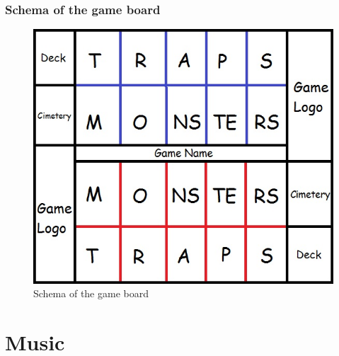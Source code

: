 \documentclass[a4paper,12pt]{book}
\begin{document}
\section{Schema of the game board}
\begin{figure}[h]
	\centering
		\includegraphics{gameboardcard.jpg}
	\caption{Schema of the game board}
	\label{fig:gameboardcard}
\end{figure}

\part{Music}
\end{document}
